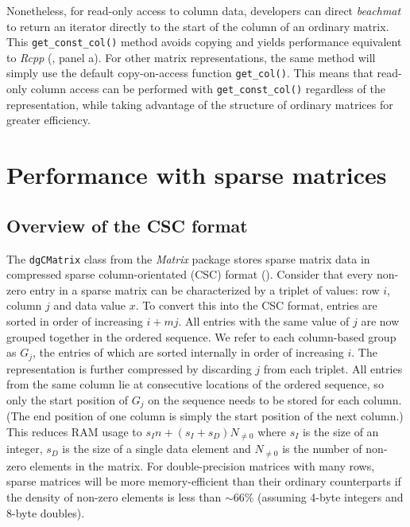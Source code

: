 \documentclass{article}
\newcommand{\beachmat}{\textit{beachmat}}
\newcommand{\code}[1]{\texttt{#1}}
\begin{document}
Nonetheless, for read-only access to column data, developers can direct \beachmat{} to return an iterator directly to the start of the column of an ordinary matrix.
This \code{get\_const\_col()} method avoids copying and yields performance equivalent to \textit{Rcpp} (\suppfigsimpleaccess{}, panel a).
For other matrix representations, the same method will simply use the default copy-on-access function \code{get\_col()}.
This means that read-only column access can be performed with \code{get\_const\_col()} regardless of the representation, while taking advantage of the structure of ordinary matrices for greater efficiency.

\section{Performance with sparse matrices}

\subsection{Overview of the CSC format}
The \code{dgCMatrix} class from the \textit{Matrix} package stores sparse matrix data in compressed sparse column-orientated (CSC) format (\suppfigsparseschem{}).
Consider that every non-zero entry in a sparse matrix can be characterized by a triplet of values: row $i$, column $j$ and data value $x$.
To convert this into the CSC format, entries are sorted in order of increasing $i + mj$.
All entries with the same value of $j$ are now grouped together in the ordered sequence.
We refer to each column-based group as $G_j$, the entries of which are sorted internally in order of increasing $i$.
The representation is further compressed by discarding $j$ from each triplet.
All entries from the same column lie at consecutive locations of the ordered sequence, so only the start position of $G_j$ on the sequence needs to be stored for each column.
(The end position of one column is simply the start position of the next column.)
This reduces RAM usage to $s_In + (s_I + s_D) N_{\ne 0}$ where $s_I$ is the size of an integer, $s_D$ is the size of a single data element and $N_{\ne 0}$ is the number of non-zero elements in the matrix.
For double-precision matrices with many rows, sparse matrices will be more memory-efficient than their ordinary counterparts if the density of non-zero elements is less than $\sim 66$\% (assuming 4-byte integers and 8-byte doubles). 

\end{document}

